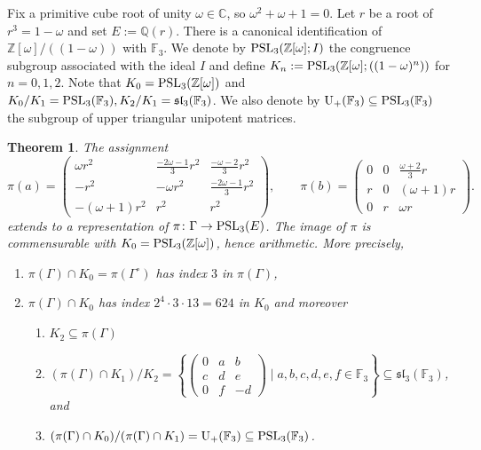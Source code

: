 \documentclass[11pt, a4paper]{amsproc}
\newcommand{\C}{\mathbb{C}}
\newtheorem{theorem}[thm]{Theorem}
\theoremstyle{remark}
\theoremstyle{plain}
\begin{document}
Fix a primitive cube root of unity $\omega\in\C$, so $\omega^2+\omega+1=0$. Let $r$ be a root of $r^3=1-\omega$ and set $E:=\mathbb Q(r)$. 
There is a canonical identification of $\mathbb Z[\omega]/((1-\omega))$ with $\mathbb F_3$.
We denote by ${\rm PSL}_3(\mathbb Z[\omega]; I)$ the congruence subgroup associated with the ideal $I$ and define
$K_n :={\rm PSL}_3(\mathbb Z[\omega]; ((1-\omega)^n))$ for $n=0,1,2$.
Note that $K_0={\rm PSL}_3(\mathbb Z[\omega])$ and $K_0/K_1= {\rm PSL}_3(\mathbb F_3), K_2/K_1 = {\mathfrak {sl}}_3(\mathbb F_3)$.
We also denote by ${\rm U}_+(\mathbb F_3) \subseteq {\rm PSL}_3(\mathbb F_3)$ the subgroup of upper triangular unipotent matrices.

\begin{theorem} \label{thm:arithmetic}
The assignment
\[
\pi(a)=
\begin{pmatrix}
\omega r^2 & \frac{-2\omega-1}{3}r^2 & \frac{-\omega-2}{3}r^2\\
-r^2 & -\omega r^2 & \frac{-2\omega-1}{3}r^2\\
-(\omega+1)r^2 & r^2 & r^2
\end{pmatrix},
\qquad
\pi(b)=
\begin{pmatrix}
0 & 0 & \frac{\omega+2}{3}r\\
 r & 0 & (\omega+1)r\\
0 & r & \omega r
\end{pmatrix}.
\]
extends to a representation of $\pi \colon \Gamma \to {\rm PSL}_3(E)$. The image of $\pi$ is commensurable with $K_0={\rm PSL}_3(\mathbb Z[\omega])$, hence arithmetic. More precisely,

\begin{enumerate}
    \item $\pi(\Gamma) \cap K_0 =\pi(\Gamma^{\circ})$ has index $3$ in $\pi(\Gamma)$,
    \item $\pi(\Gamma) \cap K_0$ has index $2^4 \cdot 3 \cdot 13 =624$ in $K_0$ and moreover
\begin{enumerate}
    \item $K_2 \subseteq \pi(\Gamma)$
    \item $(\pi(\Gamma) \cap K_1)/K_2= \left\{ \begin{pmatrix} 0 & a & b \\ c & d & e \\ 0 & f & -d  \end{pmatrix} \mid a,b,c,d,e,f \in \mathbb F_3 \right\} \subseteq {\mathfrak {sl}}_3(\mathbb F_3)$, and
    \item $(\pi(\Gamma) \cap K_0) / (\pi(\Gamma) \cap K_1) = {\rm U}_+(\mathbb F_3) \subseteq {\rm PSL}_3(\mathbb F_3)$.
\end{enumerate}
\end{enumerate}
\end{theorem}
\end{document}
